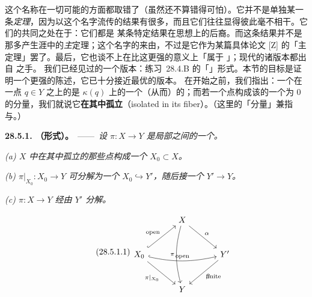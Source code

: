 
\section{\trZariskiMainTheorem}

\trZariskiMainTheorem{}这个名称在一切可能的方面都取错了（虽然还不算错得可怕）。它并不是单独某一条\emph{定理}，因为以这个名字流传的结果有很多，而且它们往往显得彼此毫不相干。它们的共同之处在于：它们都是 \trZariski{}某条特定结果在思想上的后裔。而这条结果并不是 \trZariski{}那多产生涯中的\emph{主}定理；这个名字的来由，不过是它作为某篇具体论文 [Z] 的「主定理」罢了。最后，它也谈不上在比这更强的意义上「属于 \trZariski」；现代的诸版本都出自 \trGrothendieck{}之手。
我们已经见过\trZariskiMainTheorem{}的一个版本：\mbox{练习~28.4.B} 的「\trBirational」形式。本节的目标是证明一个更强的陈述，它已十分接近最优的版本。
在开始之前，我们指出：一个\trProper\trMorphism{}在一点 $q\in Y$ 之上的\trFiber{}是\trResidueField{} $\kappa(q)$ 上的一个\trProper{}（从而\trFiniteType）的\trScheme；而若一个点构成该\trFiber{}的一个\trDimension{}为 $0$ 的分量，我们就说它\textbf{在其\trFiber{}中孤立}（isolated in its fiber）。（这里的「分量」兼指\trConnectedComponent{}与\trIrreducibleComponent。）

\textbf{28.5.1. \trZariskiMainTheorem（\trGrothendieck{}形式）。}\ ——\ \emph{设 $\pi\colon X\to Y$ 是局部\trNoether{}\trScheme{}之间的一个\trProper\trMorphism。}

\emph{(a) $X$ 中在其\trFiber{}中孤立的那些点构成一个\trOpenSubset{} $X_0\subset X$。}

\emph{(b) \trMorphism{} $\pi|_{X_0}\colon X_0\to Y$ 可分解为一个\trOpenEmbedding{} $X_0\hookrightarrow Y'$，随后接一个\trFinite\trMorphism{} $Y'\to Y$。}

\emph{(c) \trMorphism{} $\pi\colon X\to Y$ 经由 $Y'$ 分解。}

\begin{equation*}
\tag{28.5.1.1}\label{eq:zmt-factorization}
\begin{tikzcd}[row sep=2.6em, column sep=3.2em]
 & X \ar[dr, "\alpha"] \ar[dd, bend right=15, "\pi"'] & \\
X_0 \ar[ur, hook, "\text{open}"] \ar[rr, hook, bend right=12, "\text{open}"] \ar[dr, "\pi|_{X_0}"'] && Y' \ar[dl, "\beta", "\text{finite}"] \\
 & Y &
\end{tikzcd}
\end{equation*}

